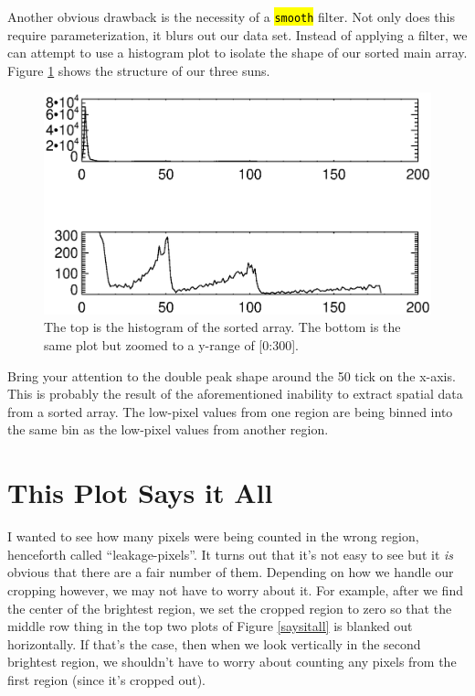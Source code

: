 \documentclass[10pt]{scrartcl}
\begin{document}
    Another obvious drawback is the necessity of a \hl{\texttt{smooth}} filter. Not only does this require parameterization, it blurs out our data set. Instead of applying a filter, we can attempt to use a histogram plot to isolate the shape of our sorted main array. Figure \ref{histozoom} shows the structure of our three suns.

\begin{figure}[!ht]
    \centering
    \includegraphics[width=.9\textwidth]{../plots_tables_images/histozoom.eps}
    \caption{The top is the histogram of the sorted array. The bottom is the same plot but zoomed to a y-range of [0:300].}
    \label{histozoom}
\end{figure}

    Bring your attention to the double peak shape around the 50 tick on the x-axis. This is probably the result of the aforementioned inability to extract spatial data from a sorted array. The low-pixel values from one region are being binned into the same bin as the low-pixel values from another region. 


\section{This Plot Says it All} %
\label{sec:this_plot_says_it_all}

    I wanted to see how many pixels were being counted in the wrong region, henceforth called ``leakage-pixels''. It turns out that it's not easy to see but it \emph{is} obvious that there are a fair number of them. Depending on how we handle our cropping however, we may not have to worry about it. For example, after we find the center of the brightest region, we set the cropped region to zero so that the middle row thing in the top two plots of Figure \ref{saysitall} is blanked out horizontally. If that's the case, then when we look vertically in the second brightest region, we shouldn't have to worry about counting any pixels from the first region (since it's cropped out). 
\end{document}
